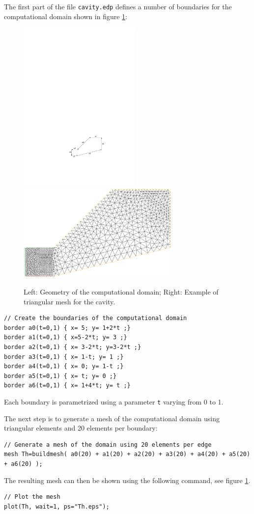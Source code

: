 \documentclass[english,3p]{elsarticle}
\newcommand{\code}[1]{\texttt{#1}}
\begin{document}
The first part of the file \code{cavity.edp} defines a number of boundaries for the computational domain shown in figure \ref{fig:CavityGeometry}:
\begin{figure}[h]
\centering
\includegraphics[width=60mm]{cavity.pdf}
\hfill
\includegraphics[width=80mm]{mesh.eps}
\caption{Left: Geometry of the computational domain; Right: Example of triangular mesh for the cavity.}
\label{fig:CavityGeometry}
\end{figure}
\begin{lstlisting}
// Create the boundaries of the computational domain
border a0(t=0,1) { x= 5; y= 1+2*t ;}
border a1(t=0,1) { x=5-2*t; y= 3 ;} 
border a2(t=0,1) { x= 3-2*t; y=3-2*t ;}
border a3(t=0,1) { x= 1-t; y= 1 ;} 
border a4(t=0,1) { x= 0; y= 1-t ;} 
border a5(t=0,1) { x= t; y= 0 ;} 
border a6(t=0,1) { x= 1+4*t; y= t ;}
\end{lstlisting}
Each boundary is parametrized using a parameter \code{t} varying from 0 to 1.

The next step is to generate a mesh of the computational domain using triangular elements and 20 elements per boundary:
\begin{lstlisting}
// Generate a mesh of the domain using 20 elements per edge
mesh Th=buildmesh( a0(20) + a1(20) + a2(20) + a3(20) + a4(20) + a5(20) + a6(20) );
\end{lstlisting}
The resulting mesh can then be shown using the following command, see figure \ref{fig:CavityGeometry}.
\begin{lstlisting}
// Plot the mesh
plot(Th, wait=1, ps="Th.eps");
\end{lstlisting}
\end{document}
